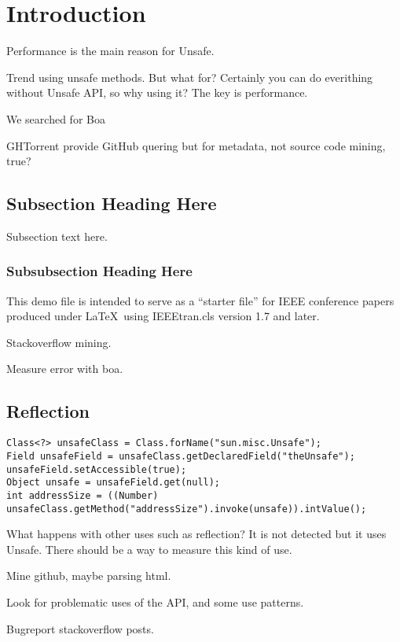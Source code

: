 
\section{Introduction} \label{sec:introduction}

Performance is the main reason for Unsafe.

Trend using unsafe methods. But what for? Certainly you can do everithing without Unsafe API, so why using it? The key is performance.

We searched for Boa \cite{Dyer-Nguyen-Rajan-Nguyen-13}


GHTorrent \cite{Gousi13} provide GitHub quering but for metadata, not source code mining, true?


\subsection{Subsection Heading Here}
Subsection text here.


\subsubsection{Subsubsection Heading Here}

%


This demo file is intended to serve as a ``starter file''
for IEEE conference papers produced under \LaTeX\ using
IEEEtran.cls version 1.7 and later.


Stackoverflow mining.

Measure error with boa.

\subsection{Reflection}

\begin{verbatim}
Class<?> unsafeClass = Class.forName("sun.misc.Unsafe");
Field unsafeField = unsafeClass.getDeclaredField("theUnsafe");
unsafeField.setAccessible(true);
Object unsafe = unsafeField.get(null);
int addressSize = ((Number) unsafeClass.getMethod("addressSize").invoke(unsafe)).intValue();
\end{verbatim}

What happens with other uses such as reflection? It is not detected but it uses Unsafe. There should be a way to measure this kind of use.

Mine github, maybe parsing html.

Look for problematic uses of the API, and some use patterns.

Bugreport stackoverflow posts.